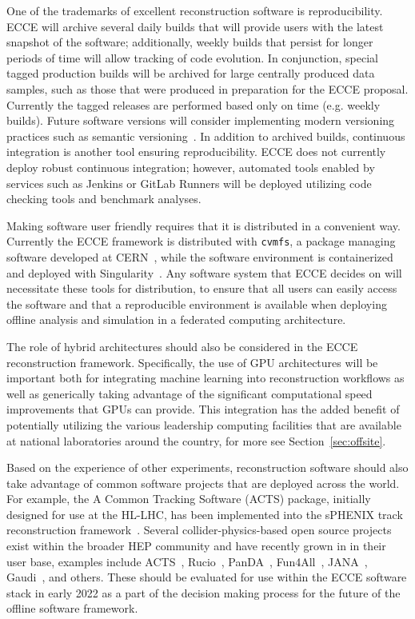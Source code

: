 One of the trademarks of excellent reconstruction software is reproducibility. ECCE will archive several daily builds that will provide users with the latest snapshot of the software; additionally, weekly builds that persist for longer periods of time will allow tracking of code evolution. In conjunction, special tagged production builds will be archived for large centrally produced data samples, such as those that were produced in preparation for the ECCE proposal. Currently the tagged releases are performed based only on time (e.g. weekly builds). Future software versions will consider implementing modern versioning practices such as semantic versioning~\cite{semantic}. In addition to archived builds, continuous integration is another tool ensuring reproducibility. ECCE does not currently deploy robust continuous integration; however, automated tools enabled by services such as Jenkins or GitLab Runners will be deployed utilizing code checking tools and benchmark analyses. 

Making software user friendly requires that it is distributed in a convenient way. Currently the ECCE framework is distributed with \texttt{cvmfs}, a package managing software developed at CERN~\cite{cernvm}, while the software environment is containerized and deployed with Singularity~\cite{singularity}. Any software system that ECCE decides on will necessitate these tools for distribution, to ensure that all users can easily access the software and that a reproducible environment is available when deploying offline analysis and simulation in a federated computing architecture.

The role of hybrid architectures should also be considered in the ECCE reconstruction framework. Specifically, the use of GPU architectures will be important both for integrating machine learning into reconstruction workflows as well as generically taking advantage of the significant computational speed improvements that GPUs can provide. This integration has the added benefit of potentially utilizing the various leadership computing facilities that are available at national laboratories around the country, for more see Section~\ref{sec:offsite}.


Based on the experience of other experiments, reconstruction software should also take advantage of common software projects that are deployed across the world. For example, the A Common Tracking Software (ACTS) package, initially designed for use at the HL-LHC, has been implemented into the sPHENIX track reconstruction framework~\cite{Osborn:2021zlr}. Several collider-physics-based open source projects exist within the broader HEP community and have recently grown in in their user base, examples include ACTS~\cite{Ai:2021ghi}, Rucio~\cite{Barisits:2019fyl}, PanDA~\cite{pandaDocs}, Fun4All~\cite{fun4allGithub}, JANA~\cite{jana2_chep19}, Gaudi~\cite{Gaudi}, and others. These should be evaluated for use within the ECCE software stack in early 2022 as a part of the decision making process for the future of the offline software framework.

